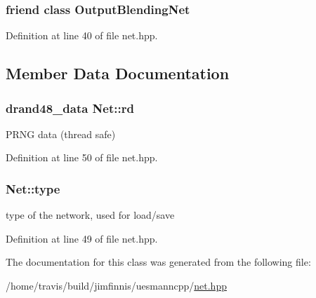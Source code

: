 \subsubsection[{\texorpdfstring{Output\+Blending\+Net}{OutputBlendingNet}}]{\setlength{\rightskip}{0pt plus 5cm}friend class {\bf Output\+Blending\+Net}\hspace{0.3cm}{\ttfamily [friend]}}\hypertarget{classNet_a9ffff8d20e4d424b4358f43e204c7d1b}{}\label{classNet_a9ffff8d20e4d424b4358f43e204c7d1b}


Definition at line 40 of file net.\+hpp.



\subsection{Member Data Documentation}
\subsubsection[{\texorpdfstring{rd}{rd}}]{\setlength{\rightskip}{0pt plus 5cm}drand48\+\_\+data Net\+::rd}\hypertarget{classNet_a364288d09aeae0b47c5adbfb470a6c1c}{}\label{classNet_a364288d09aeae0b47c5adbfb470a6c1c}


P\+R\+NG data (thread safe) 



Definition at line 50 of file net.\+hpp.

\subsubsection[{\texorpdfstring{type}{type}}]{ Net\+::type}\hypertarget{classNet_a6b6b0fb9e01f10084ce304df6d8c841d}{}\label{classNet_a6b6b0fb9e01f10084ce304df6d8c841d}


type of the network, used for load/save 



Definition at line 49 of file net.\+hpp.



The documentation for this class was generated from the following file\+:\begin{DoxyCompactItemize}
\item 
/home/travis/build/jimfinnis/uesmanncpp/\hyperlink{net_8hpp}{net.\+hpp}\end{DoxyCompactItemize}
